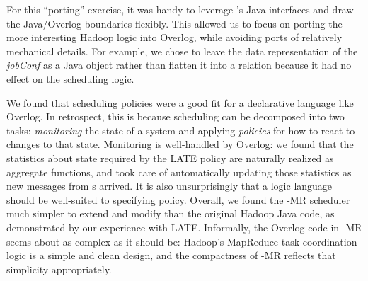 
For this ``porting'' exercise, it was handy to leverage \JOL's Java interfaces
and draw the Java/Overlog boundaries flexibly.  This allowed us to focus on
porting the more interesting Hadoop logic into Overlog, while avoiding ports of
relatively mechanical details.  For example, we chose to leave the data
representation of the \emph{jobConf} as a Java object rather than flatten it
into a relation because it had no effect on the scheduling logic.

We found that scheduling policies were a good fit for a declarative language
like Overlog. In retrospect, this is because scheduling can be decomposed into
two tasks: \emph{monitoring} the state of a system and applying \emph{policies}
for how to react to changes to that state. Monitoring is well-handled by
Overlog: we found that the statistics about {\TT} state required by the LATE
policy are naturally realized as aggregate functions, and \JOL took care of
automatically updating those statistics as new messages from {\TT}s arrived. It
is also unsurprisingly that a logic language should be well-suited to specifying
policy. Overall, we found the \BOOM-MR scheduler much simpler to extend and
modify than the original Hadoop Java code, as demonstrated by our experience
with LATE\@.  Informally, the Overlog code in \BOOM-MR seems about as complex as
it should be: Hadoop's MapReduce task coordination logic is a simple and clean
design, and the compactness of \BOOM-MR reflects that simplicity appropriately.


